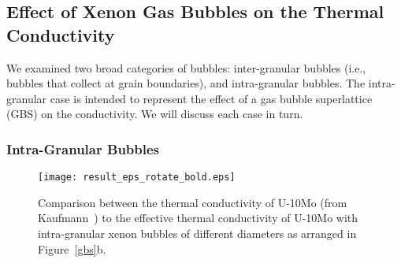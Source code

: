 \subsection{Effect of Xenon Gas Bubbles on the Thermal Conductivity} 
\label{subsec:xenonbubble}
We examined two broad categories of bubbles: inter-granular bubbles (i.e.,
bubbles that collect at grain boundaries), and intra-granular bubbles.
The intra-granular case is intended to represent the effect of a gas bubble
superlattice (GBS) on the conductivity. We will discuss each case in turn.

\subsubsection{Intra-Granular Bubbles}
\begin{figure}%
\centering
\texttt{[image: result\_eps\_rotate\_bold.eps]}
\caption[Comparision between the thermal conductivities]{Comparison between the thermal conductivity of U-10Mo (from Kaufmann~\cite{kaufmann1962nuclear}) to the effective thermal conductivity of U-10Mo with intra-granular xenon bubbles of different diameters as arranged in Figure~\ref{gbs}b.}
\label{fig_result_intra}
\end{figure}

